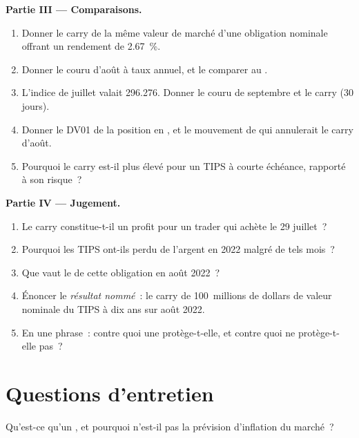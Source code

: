 \begin{problem}
\medskip\noindent\textbf{Partie III --- Comparaisons.}
\begin{enumerate}[resume]
\item Donner le carry de la même valeur de marché d'une obligation nominale offrant un rendement de 2.67~\%.
\item Donner le couru d'août à taux annuel, et le comparer au
.
\item L'indice de juillet valait 296.276. Donner le couru de septembre et le carry (30 jours).
\item Donner le DV01 de la position en , et le mouvement de  qui
annulerait le carry d'août.
\item Pourquoi le carry est-il plus élevé pour un TIPS à courte échéance, rapporté à son risque~?
\end{enumerate}

\medskip\noindent\textbf{Partie IV --- Jugement.}
\begin{enumerate}[resume]
\item Le carry constitue-t-il un profit pour un trader qui achète le 29 juillet~?
\item Pourquoi les TIPS ont-ils perdu de l'argent en 2022 malgré de tels mois~?
\item Que vaut le  de cette obligation en août 2022~?
\item Énoncer le \emph{résultat nommé}~: le carry de 100~millions de dollars de valeur nominale du
TIPS à dix ans sur août 2022.
\item En une phrase~: contre quoi une  protège-t-elle, et contre quoi ne protège-t-elle pas~?
\end{enumerate}
\end{problem}

\section{Questions d'entretien}

\begin{interviewq}\label{iq:m2:inflation-markets:1}
Qu'est-ce qu'un , et pourquoi n'est-il pas la
prévision d'inflation du marché~?
\end{interviewq}

